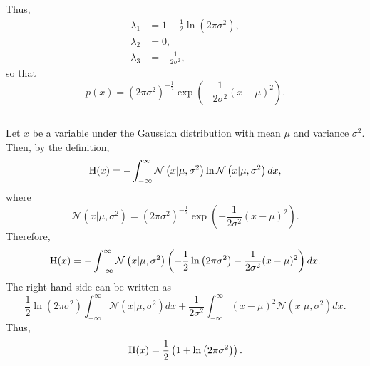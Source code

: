 %
Thus,
%
\begin{equation}
\begin{aligned}
\lambda_1 &= 1 - \frac{1}{2} \ln \left( 2 \pi \sigma ^ 2 \right), \\
\lambda_2 &= 0, \\
\lambda_3 &= - \frac{1}{2 \sigma ^ 2},
\end{aligned}
\end{equation}
%
so that
%
\begin{equation}
p(x) = \left( 2 \pi \sigma ^ 2 \right) ^ {- \frac{1}{2}} \exp \left( - \frac{1}{2 \sigma ^ 2} (x - \mu) ^ 2 \right).
\end{equation}
%


\subsection{}
\label{1.35}
Let $x$ be a variable under the Gaussian distribution with mean $\mu$ and variance $\sigma ^ 2$.
Then, by the definition,
%
\begin{equation}
{\rm H}(x) = - \int_{- \infty}^{\infty} \mathcal{N} \left( x | \mu, \sigma ^ 2 \right) \ln \mathcal{N} \left( x | \mu, \sigma ^ 2 \right) dx,
\end{equation}
%
where
%
\begin{equation}
\mathcal{N} \left( x | \mu, \sigma ^ 2 \right) = \left( 2 \pi \sigma ^ 2 \right) ^ {- \frac{1}{2}} \exp \left( - \frac{1}{2 \sigma ^2} (x - \mu) ^ 2 \right).
\end{equation}
%
Therefore,
%
\begin{equation}
{\rm H}(x) = - \int_{- \infty}^{\infty} \mathcal{N} \left( x | \mu, \sigma ^ 2 \right) \left( - \frac{1}{2} \ln \left( 2 \pi \sigma ^ 2 \right) - \frac{1}{2 \sigma ^2} (x - \mu) ^ 2 \right) dx.
\end{equation}
%
The right hand side can be written as
%
\begin{equation}
\frac{1}{2} \ln \left( 2 \pi \sigma ^ 2 \right) \int_{- \infty}^{\infty} \mathcal{N} \left( x | \mu, \sigma ^ 2 \right) dx + \frac{1}{2 \sigma ^2} \int_{- \infty}^{\infty} (x - \mu) ^ 2 \mathcal{N} \left( x | \mu, \sigma ^ 2 \right) dx.
\end{equation}
%
Thus,
%
\begin{equation}
{\rm H}(x) = \frac{1}{2} \left( 1 + \ln \left( 2 \pi \sigma ^ 2 \right) \right).
\end{equation}
%


